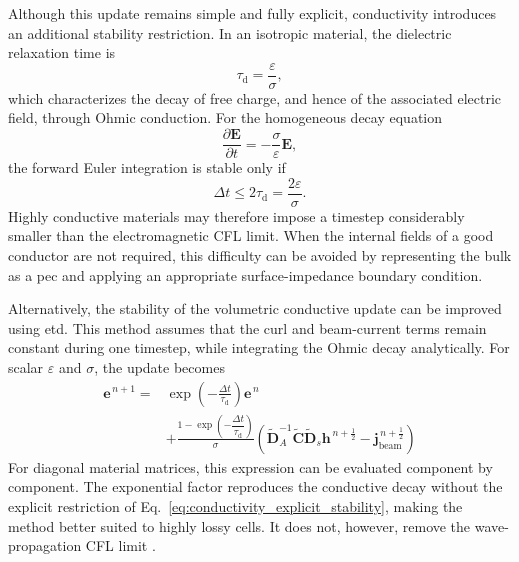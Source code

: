 Although this update remains simple and fully explicit, conductivity introduces an additional stability restriction. In an isotropic material, the dielectric relaxation time is
\begin{equation}
\tau_{\mathrm{d}}
=
\frac{\varepsilon}{\sigma},
\label{eq:dielectric_relaxation_time}
\end{equation}
which characterizes the decay of free charge, and hence of the associated electric field, through Ohmic conduction. For the homogeneous decay equation
\begin{equation}
\frac{\partial\mathbf{E}}{\partial t}
= -\frac{\sigma}{\varepsilon}\mathbf{E},
\end{equation}
the forward Euler integration is stable only if
\begin{equation}
\Delta t
\leq
2\tau_{\mathrm{d}} =
\frac{2\varepsilon}{\sigma}.
\label{eq:conductivity_explicit_stability}
\end{equation}
Highly conductive materials may therefore impose a timestep considerably smaller than the electromagnetic CFL limit. When the internal fields of a good conductor are not required, this difficulty can be avoided by representing the bulk as a
\gls{pec} and applying an appropriate surface-impedance boundary condition.

Alternatively, the stability of the volumetric conductive update can be improved using \gls{etd}. This method assumes that the curl and beam-current terms remain constant during one timestep, while integrating the Ohmic decay analytically. For scalar $\varepsilon$ and $\sigma$, the update becomes
\begin{equation}
\begin{aligned}
\mathbf{e}^{\,n+1}
={}&
\exp\left(-\frac{\Delta t}{\tau_{\mathrm{d}}}\right)
\mathbf{e}^{\,n}
\\
&+
\frac{
1-\exp\left(-\dfrac{\Delta t}{\tau_{\mathrm{d}}}\right)} {\sigma}
\left(
\widetilde{\mathbf{D}}_A^{-1}
\widetilde{\mathbf{C}}\widetilde{\mathbf{D}}_s
\mathbf{h}^{\,n+\frac{1}{2}}
-\mathbf{j}_{\mathrm{beam}}^{\,n+\frac{1}{2}}
\right)
\end{aligned}
\label{eq:fit_etd_conductivity}
\end{equation}
For diagonal material matrices, this expression can be evaluated component by component. The exponential factor reproduces the conductive decay without the explicit restriction of Eq.~\eqref{eq:conductivity_explicit_stability}, making the method better suited to highly lossy cells. It does not, however, remove the wave-propagation CFL limit \cite{585755}.


